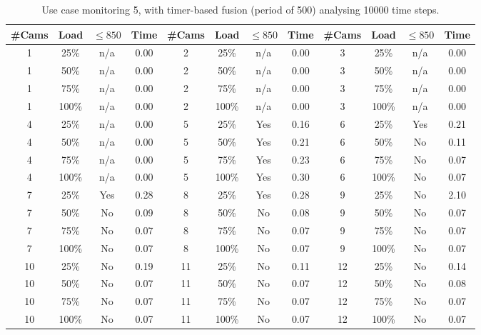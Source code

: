 \documentclass{article}
\begin{document}
\begin{table}
\centering
\begin{tabular}{|c|c|c|c|c|c|c|c|c|c|c|c|}
\hline
\#Cams & Load & $\leq 850$ & Time & \#Cams & Load & $\leq 850$ & Time & \#Cams & Load & $\leq 850$ & Time\\
\hline
1 & 25\% & n/a & 0.00 & 2 & 25\% & n/a & 0.00 & 3 & 25\% & n/a & 0.00\\
1 & 50\% & n/a & 0.00 & 2 & 50\% & n/a & 0.00 & 3 & 50\% & n/a & 0.00\\
1 & 75\% & n/a & 0.00 & 2 & 75\% & n/a & 0.00 & 3 & 75\% & n/a & 0.00\\
1 & 100\% & n/a & 0.00 & 2 & 100\% & n/a & 0.00 & 3 & 100\% & n/a & 0.00\\
\hline
4 & 25\% & n/a & 0.00 & 5 & 25\% & Yes & 0.16 & 6 & 25\% & Yes & 0.21\\
4 & 50\% & n/a & 0.00 & 5 & 50\% & Yes & 0.21 & 6 & 50\% & No & 0.11\\
4 & 75\% & n/a & 0.00 & 5 & 75\% & Yes & 0.23 & 6 & 75\% & No & 0.07\\
4 & 100\% & n/a & 0.00 & 5 & 100\% & Yes & 0.30 & 6 & 100\% & No & 0.07\\
\hline
7 & 25\% & Yes & 0.28 & 8 & 25\% & Yes & 0.28 & 9 & 25\% & No & 2.10\\
7 & 50\% & No & 0.09 & 8 & 50\% & No & 0.08 & 9 & 50\% & No & 0.07\\
7 & 75\% & No & 0.07 & 8 & 75\% & No & 0.07 & 9 & 75\% & No & 0.07\\
7 & 100\% & No & 0.07 & 8 & 100\% & No & 0.07 & 9 & 100\% & No & 0.07\\
\hline
10 & 25\% & No & 0.19 & 11 & 25\% & No & 0.11 & 12 & 25\% & No & 0.14\\
10 & 50\% & No & 0.07 & 11 & 50\% & No & 0.07 & 12 & 50\% & No & 0.08\\
10 & 75\% & No & 0.07 & 11 & 75\% & No & 0.07 & 12 & 75\% & No & 0.07\\
10 & 100\% & No & 0.07 & 11 & 100\% & No & 0.07 & 12 & 100\% & No & 0.07\\
\hline
\end{tabular}
\caption{Use case monitoring 5, with timer-based fusion (period of 500) analysing 10000 time steps.}
\end{table}
\end{document}
